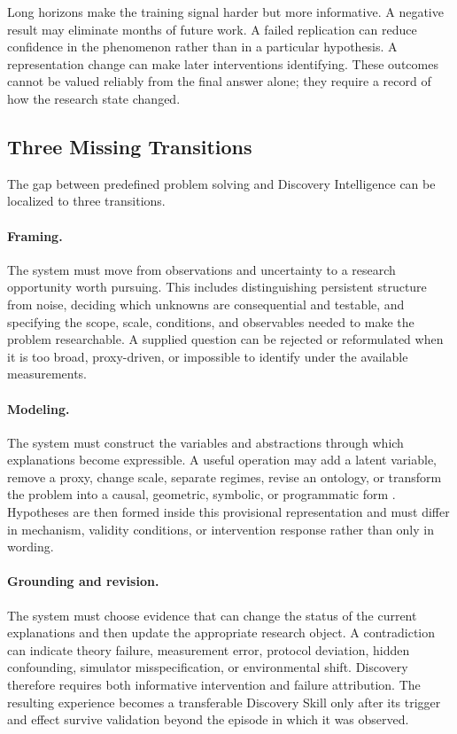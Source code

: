 \documentclass[11pt, a4paper, copyright]{google}
\begin{document}
Long horizons make the training signal harder but more informative. A negative result may eliminate months of future work. A failed replication can reduce confidence in the phenomenon rather than in a particular hypothesis. A representation change can make later interventions identifying. These outcomes cannot be valued reliably from the final answer alone; they require a record of how the research state changed.

\subsection{Three Missing Transitions}
\label{subsec:missing-discovery-capabilities}

The gap between predefined problem solving and Discovery Intelligence can be localized to three transitions.

\paragraph{Framing.}
The system must move from observations and uncertainty to a research opportunity worth pursuing. This includes distinguishing persistent structure from noise, deciding which unknowns are consequential and testable, and specifying the scope, scale, conditions, and observables needed to make the problem researchable. A supplied question can be rejected or reformulated when it is too broad, proxy-driven, or impossible to identify under the available measurements.

\paragraph{Modeling.}
The system must construct the variables and abstractions through which explanations become expressible. A useful operation may add a latent variable, remove a proxy, change scale, separate regimes, revise an ontology, or transform the problem into a causal, geometric, symbolic, or programmatic form \citep{brunton2016sindy,udrescu2020aifeynman,scholkopf2021causalrep}. Hypotheses are then formed inside this provisional representation and must differ in mechanism, validity conditions, or intervention response rather than only in wording.

\paragraph{Grounding and revision.}
The system must choose evidence that can change the status of the current explanations and then update the appropriate research object. A contradiction can indicate theory failure, measurement error, protocol deviation, hidden confounding, simulator misspecification, or environmental shift. Discovery therefore requires both informative intervention and failure attribution. The resulting experience becomes a transferable Discovery Skill only after its trigger and effect survive validation beyond the episode in which it was observed.
\end{document}
